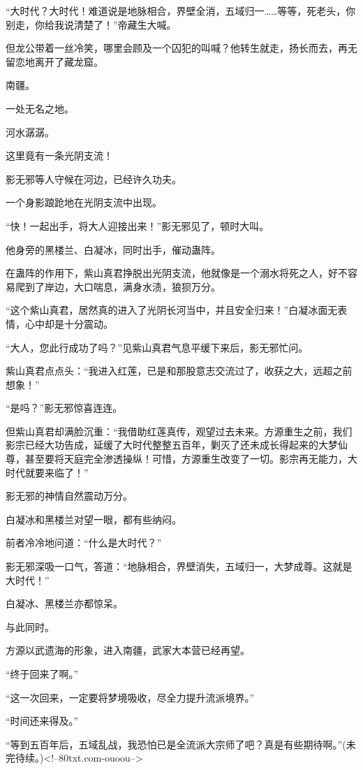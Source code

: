 \begin{this_body}
“大时代？大时代！难道说是地脉相合，界壁全消，五域归一……等等，死老头，你别走，你给我说清楚了！”帝藏生大喊。

但龙公带着一丝冷笑，哪里会顾及一个囚犯的叫喊？他转生就走，扬长而去，再无留恋地离开了藏龙窟。

南疆。

一处无名之地。

河水潺潺。

这里竟有一条光阴支流！

影无邪等人守候在河边，已经许久功夫。

一个身影踉跄地在光阴支流中出现。

“快！一起出手，将大人迎接出来！”影无邪见了，顿时大叫。

他身旁的黑楼兰、白凝冰，同时出手，催动蛊阵。

在蛊阵的作用下，紫山真君挣脱出光阴支流，他就像是一个溺水将死之人，好不容易爬到了岸边，大口喘息，满身水渍，狼狈万分。

“这个紫山真君，居然真的进入了光阴长河当中，并且安全归来！”白凝冰面无表情，心中却是十分震动。

“大人，您此行成功了吗？”见紫山真君气息平缓下来后，影无邪忙问。

紫山真君点点头：“我进入红莲，已是和那股意志交流过了，收获之大，远超之前想象！”

“是吗？”影无邪惊喜连连。

但紫山真君却满脸沉重：“我借助红莲真传，观望过去未来。方源重生之前，我们影宗已经大功告成，延缓了大时代整整五百年，剿灭了还未成长得起来的大梦仙尊，甚至要将天庭完全渗透操纵！可惜，方源重生改变了一切。影宗再无能力，大时代就要来临了！”

影无邪的神情自然震动万分。

白凝冰和黑楼兰对望一眼，都有些纳闷。

前者冷冷地问道：“什么是大时代？”

影无邪深吸一口气，答道：“地脉相合，界壁消失，五域归一，大梦成尊。这就是大时代！”

白凝冰、黑楼兰亦都惊呆。

与此同时。

方源以武遗海的形象，进入南疆，武家大本营已经再望。

“终于回来了啊。”

“这一次回来，一定要将梦境吸收，尽全力提升流派境界。”

“时间还来得及。”

“等到五百年后，五域乱战，我恐怕已是全流派大宗师了吧？真是有些期待啊。”(未完待续。)<!--80txt.com-ouoou-->

\end{this_body}

